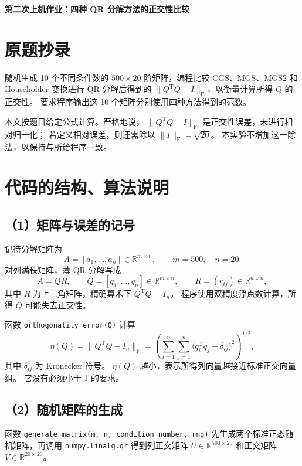 \documentclass[UTF8,a4paper,11pt,fontset=fandol]{ctexart}
\begin{document}
\pagestyle{plain}

\begin{center}
  {\Large\bfseries 第二次上机作业：四种 QR 分解方法的正交性比较}
\end{center}

\section{原题抄录}

随机生成 10 个不同条件数的 $500\times20$ 阶矩阵，编程比较
CGS、MGS、MGS2 和 Householder 变换进行 QR 分解后得到的
$\|Q^{\mathrm T}Q-I\|_{\mathrm F}$，以衡量计算所得 $Q$ 的正交性。
要求程序输出这 10 个矩阵分别使用四种方法得到的范数。

本文按题目给定公式计算。严格地说，
$\|Q^{\mathrm T}Q-I\|_{\mathrm F}$ 是正交性误差，未进行相对归一化；
若定义相对误差，则还需除以 $\|I\|_{\mathrm F}=\sqrt{20}$。
本实验不增加这一除法，以保持与所给程序一致。

\section{代码的结构、算法说明}

\subsection*{（1）矩阵与误差的记号}

记待分解矩阵为
\[
A=[a_1,\ldots,a_n]\in\mathbb R^{m\times n},
\qquad m=500,\quad n=20.
\]
对列满秩矩阵，薄 QR 分解写成
\[
A=QR,\qquad
Q=[q_1,\ldots,q_n]\in\mathbb R^{m\times n},
\qquad R=(r_{ij})\in\mathbb R^{n\times n},
\]
其中 $R$ 为上三角矩阵，精确算术下 $Q^{\mathrm T}Q=I_n$。
程序使用双精度浮点数计算，所得 $Q$ 可能失去正交性。

函数 \texttt{orthogonality\_error(Q)} 计算
\[
\eta(Q)=\|Q^{\mathrm T}Q-I_n\|_{\mathrm F}
=\left(
\sum_{i=1}^{n}\sum_{j=1}^{n}
\bigl(q_i^{\mathrm T}q_j-\delta_{ij}\bigr)^2
\right)^{1/2},
\]
其中 $\delta_{ij}$ 为 Kronecker 符号。
$\eta(Q)$ 越小，表示所得列向量越接近标准正交向量组。
它没有必须小于 1 的要求。

\subsection*{（2）随机矩阵的生成}

函数
\texttt{generate\_matrix(m, n, condition\_number, rng)}
先生成两个标准正态随机矩阵，再调用
\texttt{numpy.linalg.qr}
得到列正交矩阵 $U\in\mathbb R^{500\times20}$ 和正交矩阵
$V\in\mathbb R^{20\times20}$。
\end{document}
